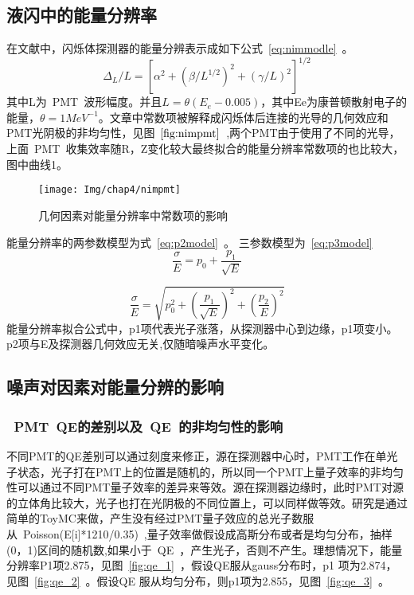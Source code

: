 \subsection{液闪中的能量分辨率}
在文献\citep{scholermann1980optimizing}中，闪烁体探测器的能量分辨表示成如下公式~\ref{eq:nimmodle}~。
\begin{equation}\label{eq:nimmodle}
\Delta_L /L = [ \alpha^2 + (\beta/L^{1/2})^2+(\gamma/L)^2]^{1/2}
\end{equation}
其中L为~PMT~波形幅度。并且$L=\theta(E_e-0.005)$，其中Ee为康普顿散射电子的能量，$\theta=1 MeV^{-1}$。文章中常数项被解释成闪烁体后连接的光导的几何效应和PMT光阴极的非均匀性，见图~$\ref{fig:nimpmt}$~,两个PMT由于使用了不同的光导，上面~PMT~收集效率随R，Z变化较大最终拟合的能量分辨率常数项的也比较大，图中曲线1。
 \begin{figure}[!htbp]
  \centering
   \texttt{[image: Img/chap4/nimpmt]}
    \caption{几何因素对能量分辨率中常数项的影响}
  \label{fig:nimpmt}
\end{figure}

能量分辨率的两参数模型为式~\ref{eq:p2model}~。
三参数模型为~\ref{eq:p3model}~
\begin{equation}\label{eq:p2model}
 \frac{\sigma}{E}=p_0+\frac{p_1}{\sqrt{E}}
\end{equation}

\begin{equation}\label{eq:p3model}
  \frac{\sigma}{E}=\sqrt{p_0^2+{(\frac{p_1}{\sqrt{E}})}^2+{(\frac{p_2}{E})}^2}
\end{equation}
能量分辨率拟合公式中，p1项代表光子涨落，从探测器中心到边缘，p1项变小。p2项与E及探测器几何效应无关,仅随暗噪声水平变化。

\subsection{噪声对因素对能量分辨的影响}
\subsubsection{~PMT~QE的差别以及~QE~的非均匀性的影响}
不同PMT的QE差别可以通过刻度来修正，源在探测器中心时，PMT工作在单光子状态，光子打在PMT上的位置是随机的，所以同一个PMT上量子效率的非均匀性可以通过不同PMT量子效率的差异来等效。源在探测器边缘时，此时PMT对源的立体角比较大，光子也打在光阴极的不同位置上，可以同样做等效。研究是通过简单的ToyMC来做，产生没有经过PMT量子效应的总光子数服从~Poisson(E[i]*1210/0.35)~,量子效率做假设成高斯分布或者是均匀分布，抽样(0，1)区间的随机数,如果小于~QE~，产生光子，否则不产生。理想情况下，能量分辨率P1项2.875，见图~\ref{fig:qe_1}~，假设QE服从gauss分布时，p1 项为2.874，见图~\ref{fig:qe_2}~。假设QE 服从均匀分布，则p1项为2.855，见图~\ref{fig:qe_3}~。

